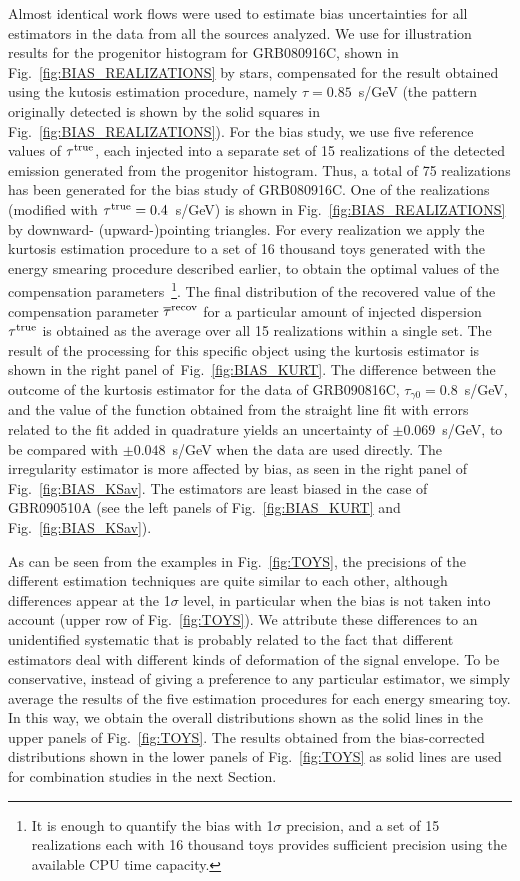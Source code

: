 \documentclass[12pt]{article}
\begin{document}
{Almost identical work flows were used to estimate bias uncertainties for all estimators in the data from all the sources analyzed.
We use for illustration results for the progenitor histogram for GRB080916C, shown in Fig.~\ref{fig:BIAS_REALIZATIONS} by stars,
compensated for the result obtained using the kutosis estimation procedure, namely $\tau  = 0.85$~s/GeV
(the pattern originally detected  is shown by the solid squares in Fig.~\ref{fig:BIAS_REALIZATIONS}). For the bias study, we use five reference values
of $\tau ^{\rm true}$, each injected into a separate set of 15
realizations of the detected emission generated from the progenitor histogram.
Thus, a total of 75 realizations has been generated for the bias study of GRB080916C.
One of the realizations (modified with $\tau ^{\rm true}=0.4$~s/GeV) is shown in Fig.~\ref{fig:BIAS_REALIZATIONS} by downward-
(upward-)pointing triangles. For every realization we apply the kurtosis estimation procedure
to a set of 16 thousand toys generated with the energy smearing procedure described earlier, to obtain the optimal
values of the compensation parameters~\footnote{It is enough to quantify the bias with 1$\sigma$ precision,
and a set of 15 realizations each with 16 thousand toys provides sufficient precision using the available CPU time capacity.}.
The final distribution of the recovered value of the compensation parameter
$\overline\tau ^{\rm recov}$ for a particular amount of injected dispersion $\tau ^{\rm true}$ is obtained as the
average over all 15 realizations within a single set. The result of the processing for this specific object using the kurtosis estimator
is shown in the right panel of~Fig.~\ref{fig:BIAS_KURT}. The difference between the outcome of the kurtosis estimator for the data of GRB090816C,
$\tau_{\gamma 0} = 0.8$~s/GeV, and the value of the function obtained from the straight line fit
with errors related to the fit added in quadrature yields an uncertainty of
$\pm 0.069$~s/GeV, to be compared with  $\pm 0.048$~s/GeV when the data are used directly. The irregularity estimator is more
affected by bias, as seen in the right panel of Fig.~\ref{fig:BIAS_KSav}.
The estimators are least biased
in the case of GBR090510A (see the left panels of Fig.~\ref{fig:BIAS_KURT} and Fig.~\ref{fig:BIAS_KSav}).

As can be seen from the examples in  Fig.~\ref{fig:TOYS}, the precisions of the different estimation
techniques are quite similar to each other, although differences appear at the 1$\sigma$ level,
in particular when the bias is not taken into account (upper row of Fig.~\ref{fig:TOYS}).
We attribute these differences to an unidentified systematic that is probably related to the fact that
different estimators deal with different kinds of deformation of the signal envelope.
To be conservative, instead of giving a preference to any particular estimator, we simply average
the results of the five estimation procedures for each energy smearing toy.
In this way, we obtain the overall distributions shown as the solid lines in the upper panels of Fig.~\ref{fig:TOYS}.
The results obtained from the bias-corrected distributions shown in the lower panels of Fig.~\ref{fig:TOYS} as
solid lines are used for combination studies in the next Section.


}
\end{document}
